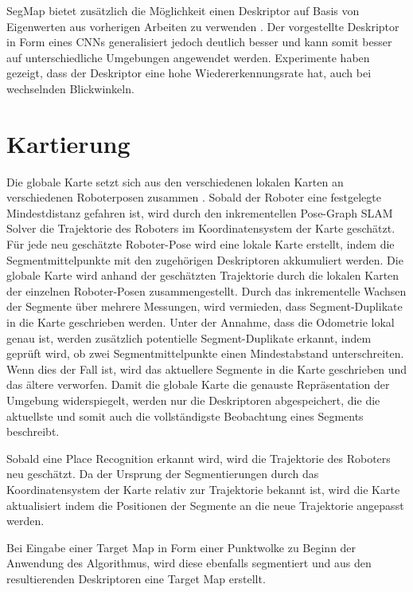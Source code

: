 SegMap bietet zusätzlich die Möglichkeit einen Deskriptor auf Basis von Eigenwerten aus vorherigen Arbeiten zu verwenden \cite{Dube2017a}. Der vorgestellte Deskriptor in Form eines CNNs generalisiert jedoch deutlich besser und kann somit besser auf unterschiedliche Umgebungen angewendet werden. Experimente haben gezeigt, dass der Deskriptor eine hohe Wiedererkennungsrate hat, auch bei wechselnden Blickwinkeln. 


\section[Kartierung (Kopp)]{Kartierung}

Die globale Karte setzt sich aus den verschiedenen lokalen Karten an verschiedenen Roboterposen zusammen \cite{Dube2017b}. Sobald der Roboter eine festgelegte Mindestdistanz gefahren ist, wird durch den inkrementellen Pose-Graph SLAM Solver die Trajektorie des Roboters im Koordinatensystem der Karte geschätzt. Für jede neu geschätzte Roboter-Pose wird eine lokale Karte erstellt, indem die Segmentmittelpunkte mit den zugehörigen Deskriptoren akkumuliert werden. Die globale Karte wird anhand der geschätzten Trajektorie durch die lokalen Karten der einzelnen Roboter-Posen zusammengestellt. Durch das inkrementelle Wachsen der Segmente über mehrere Messungen, wird vermieden, dass Segment-Duplikate in die Karte geschrieben werden. Unter der Annahme, dass die Odometrie lokal genau ist, werden zusätzlich potentielle Segment-Duplikate erkannt, indem geprüft wird, ob zwei Segmentmittelpunkte einen Mindestabstand unterschreiten. Wenn dies der Fall ist, wird das aktuellere Segmente in die Karte geschrieben und das ältere verworfen. Damit die globale Karte die genauste Repräsentation der Umgebung widerspiegelt, werden nur die Deskriptoren ab\-ge\-spei\-chert, die die aktuellste und somit auch die vollständigste Beobachtung eines Segments beschreibt.

Sobald eine Place Recognition erkannt wird, wird die Trajektorie des Roboters neu geschätzt. Da der Ursprung der Segmentierungen durch das Koordinatensystem der Karte relativ zur Trajektorie bekannt ist, wird die Karte aktualisiert indem die Positionen der Segmente an die  neue Trajektorie angepasst werden. 

Bei Eingabe einer Target Map in Form einer Punktwolke zu Beginn der Anwendung des  Algorithmus, wird diese ebenfalls  segmentiert und aus den resultierenden Deskriptoren eine Target Map erstellt. 

